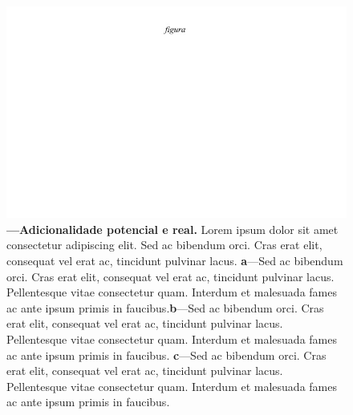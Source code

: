 \documentclass[./main.tex]{subfiles}
\begin{document}
\begin{figure}[t!] 
\centering				
\includegraphics[width=0.98\linewidth]{figs/fig_m.jpg}		
\caption[Lorem ipsum dolor sit amet]
{\textbf{---\;Adicionalidade potencial e real.}
    Lorem ipsum dolor sit amet consectetur adipiscing elit. Sed ac bibendum orci. Cras erat elit, consequat vel erat ac, tincidunt pulvinar lacus. \;\textbf{a}\;---\;Sed ac bibendum orci. Cras erat elit, consequat vel erat ac, tincidunt pulvinar lacus. Pellentesque vitae consectetur quam. Interdum et malesuada fames ac ante ipsum primis in faucibus.\;\textbf{b}\;---\;Sed ac bibendum orci. Cras erat elit, consequat vel erat ac, tincidunt pulvinar lacus. Pellentesque vitae consectetur quam. Interdum et malesuada fames ac ante ipsum primis in faucibus. \;\textbf{c}\;---\;Sed ac bibendum orci. Cras erat elit, consequat vel erat ac, tincidunt pulvinar lacus. Pellentesque vitae consectetur quam. Interdum et malesuada fames ac ante ipsum primis in faucibus.
}
\label{fig:eco:add} 		
\end{figure}
\end{document}

